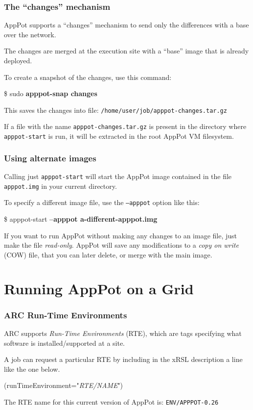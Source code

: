 \documentclass[english,serif,mathserif,xcolor=pdftex,dvipsnames,table]{beamer}
\newcommand{\+}{\largeskip}
\begin{document}
\begin{frame}[fragile]
  \frametitle{The ``changes'' mechanism}
  AppPot supports a ``changes'' mechanism to send only the
  differences with a base over the network.  

  \+
  The changes are merged at the execution site with a ``base'' image
  that is already deployed.

  \+
  To create a snapshot of the changes, use this command:
\begin{semiverbatim}
\$ sudo \textbf{apppot-snap changes}
\end{semiverbatim}
  This saves the changes into file: \texttt{/home/user/job/apppot-changes.tar.gz}

  \+
  If a file with the name \texttt{apppot-changes.tar.gz} is present in
  the directory where \texttt{apppot-start} is run, it will be extracted
  in the root AppPot VM filesystem.
\end{frame}

\begin{frame}
  \frametitle{Using alternate images}
  \+ Calling just \texttt{apppot-start} will start the AppPot image
  contained in the file \texttt{apppot.img} in your current directory.

  \+ To specify a different image file, use the \texttt{--apppot}
  option like this:
\begin{semiverbatim}
\$ apppot-start \textbf{--apppot a-different-apppot.img}
\end{semiverbatim}

  \+ If you want to run AppPot without making any changes to an image
  file, just make the file \emph{read-only}.  AppPot will save any
  modifications to a \emph{copy on write} (COW) file, that you can
  later delete, or merge with the main image.
\end{frame}


\section{Running AppPot on a Grid}

\begin{frame}[fragile]
  \frametitle{ARC Run-Time Environments}
  ARC supports \emph{Run-Time Environments} (RTE), which are tags
  specifying what software is installed/supported at a site.

  \+
  A job can request a particular RTE by including in the xRSL
  description a line like the one below.
\begin{semiverbatim}
(runTimeEnvironment="\emph{RTE/NAME}")
\end{semiverbatim}

  \+
  The RTE name for this current version of AppPot is: \texttt{ENV/APPPOT-0.26}
\end{frame}
\end{document}
